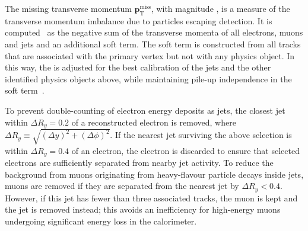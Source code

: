 The missing transverse momentum $\mathbf{p}^\text{miss}_\text{T}$, with
magnitude \met, is a measure of the transverse momentum imbalance due to
particles escaping detection. It is computed~\cite{PERF-2011-07} as the
negative sum of the transverse momenta of all electrons, muons and jets and an
additional soft term. The soft term is constructed from all tracks that are associated 
with the primary vertex but not with any physics object. In this way, the \met is adjusted for the best calibration of the jets
and the other identified physics objects above, while maintaining pile-up
independence in the soft term~\cite{ATL-PHYS-PUB-2015-027,
ATL-PHYS-PUB-2015-023}.

To prevent double-counting of electron energy deposits as jets, the closest jet
within $\Delta R_y = 0.2$ of a reconstructed electron is removed, where $\Delta
R_y \equiv \sqrt{(\Delta y)^2 + (\Delta\phi)^2}$.  If the nearest jet surviving
the above selection is within $\Delta R_y = 0.4$ of an electron, the electron
is discarded to ensure that selected electrons are sufficiently separated from
nearby jet activity.  To reduce the background from muons originating from heavy-flavour particle
decays inside jets, muons are removed if they are separated from the nearest
jet by $\Delta R_y < 0.4$.  However, if this jet has fewer than three
associated tracks, the muon is kept and the jet is removed instead; this avoids
an inefficiency for high-energy muons undergoing significant energy loss in the
calorimeter.
